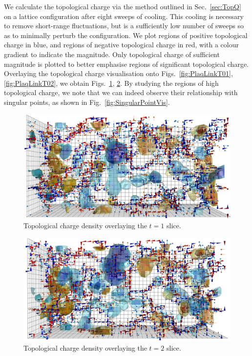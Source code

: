 We calculate the topological charge via the method outlined in Sec.~\ref{sec:TopQ} on a lattice configuration after eight sweeps of cooling. This cooling is necessary to remove short-range fluctuations, but is a sufficiently low number of sweeps so as to minimally perturb the configuration. We plot regions of positive topological charge in blue, and regions of negative topological charge in red, with a colour gradient to indicate the magnitude. Only topological charge of sufficient magnitude is plotted to better emphasise regions of significant topological charge. Overlaying the topological charge visualisation onto Figs.~\ref{fig:PlaqLinkT01}, \ref{fig:PlaqLinkT02}, we obtain Figs.~\ref{fig:PlaqLinkQT01}, \ref{fig:PlaqLinkQT02}. By studying the regions of high topological charge, we note that we can indeed observe their relationship with singular points, as shown in Fig.~\ref{fig:SingularPointVis}.\\
\newpage
%
\begin{figure}[H]
\centering
\includegraphics[width=\linewidth]{./PlaqLinkTopQ_CFG95_T01.png}
\caption{\label{fig:PlaqLinkQT01}Topological charge density overlaying the $t=1$ slice.}
\end{figure}
%
\begin{figure}[H]
\centering
\includegraphics[width=\linewidth]{./PlaqLinkTopQ_CFG95_T02.png}
\caption{\label{fig:PlaqLinkQT02}Topological charge density overlaying the $t=2$ slice.}
\end{figure}
